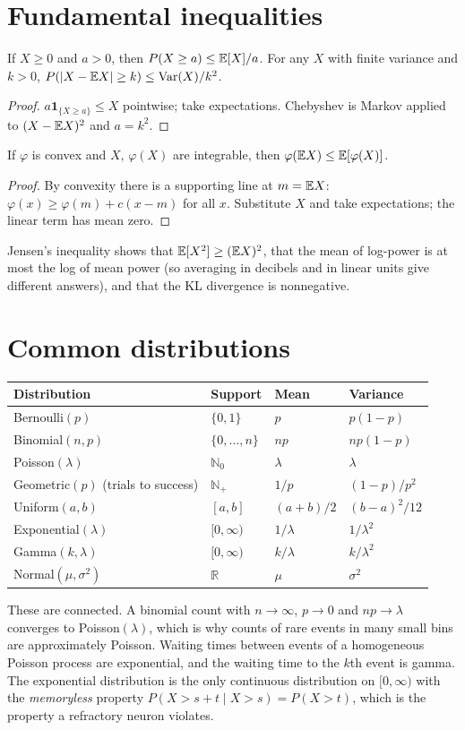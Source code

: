 \section{Fundamental inequalities}
\begin{theorem}
If $X\ge0$ and $a>0$, then $P(X\ge a)\le\mathbb E[X]/a$. For any $X$ with finite variance and $k>0$, $P(|X-\mathbb E X|\ge k)\le\operatorname{Var}(X)/k^2$.
\end{theorem}
\begin{proof}
$a\mathbf 1_{\{X\ge a\}}\le X$ pointwise; take expectations. Chebyshev is Markov applied to $(X-\mathbb E X)^2$ and $a=k^2$.
\end{proof}

\begin{theorem}[Jensen]
If $\varphi$ is convex and $X$, $\varphi(X)$ are integrable, then $\varphi(\mathbb E X)\le\mathbb E[\varphi(X)]$.
\end{theorem}
\begin{proof}
By convexity there is a supporting line at $m=\mathbb E X$: $\varphi(x)\ge\varphi(m)+c(x-m)$ for all $x$. Substitute $X$ and take expectations; the linear term has mean zero.
\end{proof}
Jensen's inequality shows that $\mathbb E[X^2]\ge(\mathbb E X)^2$, that the mean of log-power is at most the log of mean power (so averaging in decibels and in linear units give different answers), and that the KL divergence is nonnegative.

\section{Common distributions}
\begin{center}
\begin{tabular}{@{}llll@{}}
\toprule
Distribution & Support & Mean & Variance\\
\midrule
Bernoulli$(p)$ & $\{0,1\}$ & $p$ & $p(1-p)$\\
Binomial$(n,p)$ & $\{0,\ldots,n\}$ & $np$ & $np(1-p)$\\
Poisson$(\lambda)$ & $\mathbb N_0$ & $\lambda$ & $\lambda$\\
Geometric$(p)$ (trials to success) & $\mathbb N_+$ & $1/p$ & $(1-p)/p^2$\\
Uniform$(a,b)$ & $[a,b]$ & $(a+b)/2$ & $(b-a)^2/12$\\
Exponential$(\lambda)$ & $[0,\infty)$ & $1/\lambda$ & $1/\lambda^2$\\
Gamma$(k,\lambda)$ & $[0,\infty)$ & $k/\lambda$ & $k/\lambda^2$\\
Normal$(\mu,\sigma^2)$ & $\mathbb R$ & $\mu$ & $\sigma^2$\\
\bottomrule
\end{tabular}
\end{center}
These are connected. A binomial count with $n\to\infty$, $p\to0$ and $np\to\lambda$ converges to Poisson$(\lambda)$, which is why counts of rare events in many small bins are approximately Poisson. Waiting times between events of a homogeneous Poisson process are exponential, and the waiting time to the $k$th event is gamma. The exponential distribution is the only continuous distribution on $[0,\infty)$ with the \emph{memoryless} property $P(X>s+t\mid X>s)=P(X>t)$, which is the property a refractory neuron violates.

